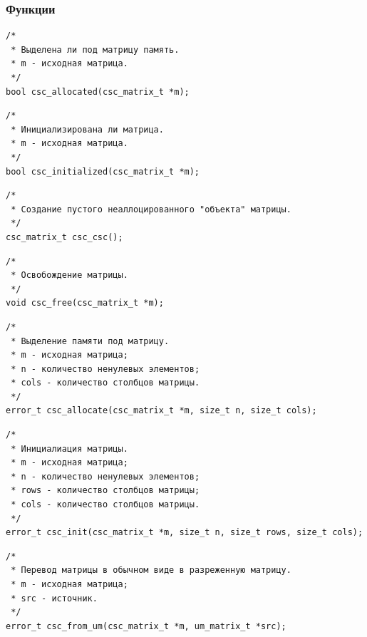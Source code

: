 \documentclass[a4paper,12pt]{extarticle}
\begin{document}
\subsubsection{Функции}
\begin{verbatim}
/*
 * Выделена ли под матрицу память.
 * m - исходная матрица.
 */
bool csc_allocated(csc_matrix_t *m);
\end{verbatim}


 \vspace{0.5cm}

\begin{verbatim}
/*
 * Инициализирована ли матрица.
 * m - исходная матрица.
 */
bool csc_initialized(csc_matrix_t *m);
\end{verbatim}


 \vspace{0.5cm}


\begin{verbatim}
/*
 * Создание пустого неаллоцированного "объекта" матрицы.
 */
csc_matrix_t csc_csc();
\end{verbatim}


 \vspace{0.5cm}


\begin{verbatim}
/*
 * Освобождение матрицы.
 */
void csc_free(csc_matrix_t *m);
\end{verbatim}


 \vspace{0.5cm}


\begin{verbatim}
/*
 * Выделение памяти под матрицу.
 * m - исходная матрица;
 * n - количество ненулевых элементов;
 * cols - количество столбцов матрицы.
 */
error_t csc_allocate(csc_matrix_t *m, size_t n, size_t cols);
\end{verbatim}


 \vspace{0.5cm}


\begin{verbatim}
/*
 * Инициалиация матрицы.
 * m - исходная матрица;
 * n - количество ненулевых элементов;
 * rows - количество столбцов матрицы;
 * cols - количество столбцов матрицы.
 */
error_t csc_init(csc_matrix_t *m, size_t n, size_t rows, size_t cols);
\end{verbatim}


 \vspace{0.5cm}


\begin{verbatim}
/*
 * Перевод матрицы в обычном виде в разреженную матрицу.
 * m - исходная матрица;
 * src - источник.
 */
error_t csc_from_um(csc_matrix_t *m, um_matrix_t *src);
\end{verbatim}
\end{document}
